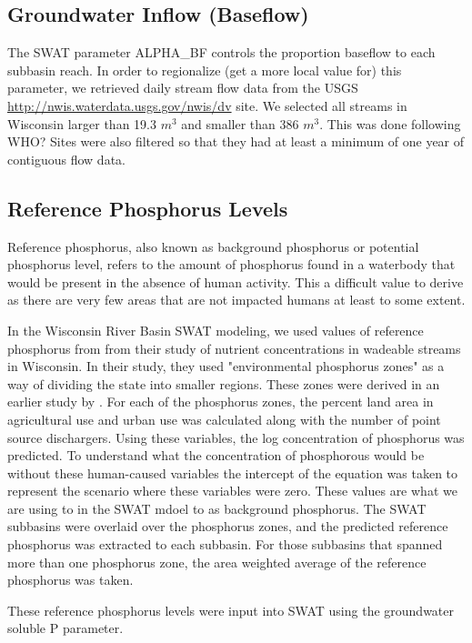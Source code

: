 \subsection{Groundwater Inflow (Baseflow)}
	The SWAT parameter ALPHA\_BF controls the proportion baseflow to each subbasin reach. In order to regionalize (get a more local value for) this parameter, we retrieved daily stream flow data from the USGS \href{NWIS}{http://nwis.waterdata.usgs.gov/nwis/dv} site. We selected all streams in Wisconsin larger than 19.3 $m^3$ and smaller than 386 $m^3$. This was done following WHO? Sites were also filtered so that they had at least a minimum of one year of contiguous flow data. 

\subsection{Reference Phosphorus Levels}
	Reference phosphorus, also known as background phosphorus or potential phosphorus level, refers to the amount of phosphorus found in a waterbody that would be present in the absence of human activity. This a difficult value to derive as there are very few areas that are not impacted humans at least to some extent. 
	
	In the Wisconsin River Basin SWAT modeling, we used values of reference phosphorus from \citet{robertson_wadeable_2006} from their study of nutrient concentrations in wadeable streams in Wisconsin. In their study, they used "environmental phosphorus zones" as a way of dividing the state into smaller regions. These zones were derived in an earlier study by \citet{robertson_phosphoruszones_2006}. 
	For each of the phosphorus zones, the percent land area in agricultural use and urban use was calculated along with the number of point source dischargers. Using these variables, the log concentration of phosphorus was predicted. To understand what the concentration of phosphorous would be without these human-caused variables the intercept of the equation was taken to represent the scenario where these variables were zero. These values are what we are using to in the SWAT mdoel to as background phosphorus. The SWAT subbasins were overlaid over the phosphorus zones, and the predicted reference phosphorus was extracted to each subbasin. For those subbasins that spanned more than one phosphorus zone, the area weighted average of the reference phosphorus was taken.
	
	These reference phosphorus levels were input into SWAT using the groundwater soluble P parameter.